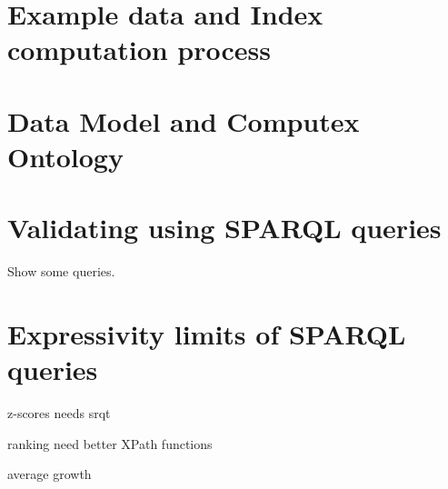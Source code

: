 \section{Example data and Index computation process}


\section{Data Model and Computex Ontology}


\section{Validating using SPARQL queries}


Show some queries.

\section{Expressivity limits of SPARQL queries}

z-scores needs srqt

ranking need better XPath functions

average growth


